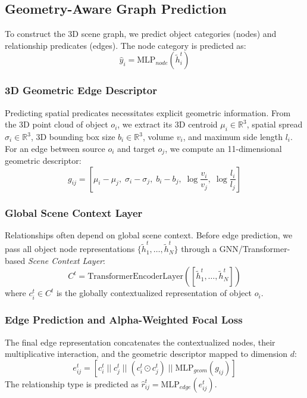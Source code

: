\documentclass[letterpaper]{article}
\begin{document}
\subsection{Geometry-Aware Graph Prediction}
To construct the 3D scene graph, we predict object categories (nodes) and relationship predicates (edges). 
The node category is predicted as:
\begin{equation}
\hat{y}_i = \text{MLP}_{node}(\tilde{h}_i^t)
\end{equation}

\subsubsection{3D Geometric Edge Descriptor}
Predicting spatial predicates necessitates explicit geometric information. From the 3D point cloud of object $o_i$, we extract its 3D centroid $\mu_i \in \mathbb{R}^3$, spatial spread $\sigma_i \in \mathbb{R}^3$, 3D bounding box size $b_i \in \mathbb{R}^3$, volume $v_i$, and maximum side length $l_i$. For an edge between source $o_i$ and target $o_j$, we compute an 11-dimensional geometric descriptor:
\begin{equation}
g_{ij} = [\mu_i - \mu_j, \; \sigma_i - \sigma_j, \; b_i - b_j, \; \log\frac{v_i}{v_j}, \; \log\frac{l_i}{l_j}]
\end{equation}

\subsubsection{Global Scene Context Layer}
Relationships often depend on global scene context. Before edge prediction, we pass all object node representations $\{\tilde{h}_1^t, \dots, \tilde{h}_N^t\}$ through a GNN/Transformer-based \textit{Scene Context Layer}:
\begin{equation}
C^t = \text{TransformerEncoderLayer}([\tilde{h}_1^t, \dots, \tilde{h}_N^t])
\end{equation}
where $c_i^t \in C^t$ is the globally contextualized representation of object $o_i$. 

\subsubsection{Edge Prediction and Alpha-Weighted Focal Loss}
The final edge representation concatenates the contextualized nodes, their multiplicative interaction, and the geometric descriptor mapped to dimension $d$:
\begin{equation}
e_{ij}^t = [c_i^t \; || \; c_j^t \; || \; (c_i^t \odot c_j^t) \; || \; \text{MLP}_{geom}(g_{ij})]
\end{equation}
The relationship type is predicted as $\hat{r}_{ij}^t = \text{MLP}_{edge}(e_{ij}^t)$. 
\end{document}
